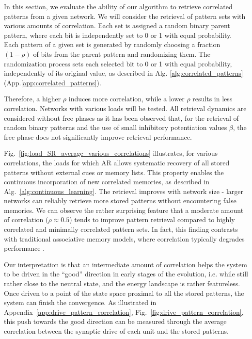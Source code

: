 \documentclass[10pt,letterpaper]{article}
\begin{document}
In this section, we evaluate the ability of our algorithm to retrieve correlated patterns from a given network. 
We will consider the retrieval of pattern sets with various amounts of correlation. Each set is assigned a random binary parent pattern, where each bit is independently set to 0 or 1 with equal probability.
Each pattern of a given set is generated by randomly choosing a fraction $(1-\rho)$ of bits from the parent pattern and randomizing them. The randomization process sets each selected bit to 0 or 1 with equal probability, independently of its original value, as described in Alg.
\ref{alg:correlated_patterns} (App.\ref{app:correlated_patterns}).

Therefore, a higher $\rho$ induces more correlation, while a lower $\rho$ results in less correlation.
Networks with various loads will be tested. 
All retrieval dynamics are considered without free phases as it has been observed that, for the retrieval of random binary patterns and the use of small inhibitory potentiation values $\beta$, the free phase does not significantly improve retrieval performance.

Fig.~\ref{fig:load_SR_average_various_correlations} illustrates, for various correlations, the loads for which AR allows systematic recovery of all stored patterns without external cues or memory lists. This property enables the continuous incorporation of new correlated memories, as described in Alg.~\ref{alg:continuous_learning}. The retrieval improves with network size - larger networks can reliably retrieve more stored patterns without encountering false memories. We can observe the rather surprising feature that a moderate amount of correlation ($\rho \approx 0.5$) tends to improve pattern retrieval compared to highly correlated and minimally correlated pattern sets. In fact, this finding contrasts with traditional associative memory models, where correlation typically degrades performance \cite{fontanari_storage_1990}.

Our interpretation is that an intermediate amount of correlation helps the system to be driven in the ``good'' direction in early stages of the evolution, i.e. while still rather close to the neutral state, and the energy landscape is rather featureless. Once driven to a point of the state space proximal to all the stored patterns, the system can finish the convergence. As illustrated in Appendix~\ref{app:drive_pattern_correlation}, Fig.~\ref{fig:drive_pattern_correlation}, this push towards the good direction can be measured through the average correlation between the synaptic drive of each unit and the stored patterns.
\end{document}
